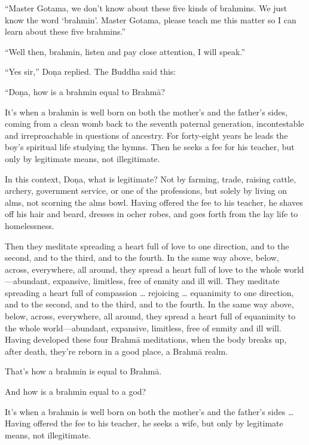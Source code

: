 \documentclass[12pt,openany]{book}%
\begin{document}
“Master Gotama, we don’t know about these five kinds of brahmins. We just know the word ‘brahmin’. Master Gotama, please teach me this matter so I can learn about these five brahmins.” 

“Well then, brahmin, listen and pay close attention, I will speak.” 

“Yes sir,” \textsanskrit{Doṇa} replied. The Buddha said this: 

“\textsanskrit{Doṇa}, how is a brahmin equal to \textsanskrit{Brahmā}? 

It’s when a brahmin is well born on both the mother’s and the father’s sides, coming from a clean womb back to the seventh paternal generation, incontestable and irreproachable in questions of ancestry. For forty-eight years he leads the boy’s spiritual life studying the hymns. Then he seeks a fee for his teacher, but only by legitimate means, not illegitimate. 

In this context, \textsanskrit{Doṇa}, what is legitimate? Not by farming, trade, raising cattle, archery, government service, or one of the professions, but solely by living on alms, not scorning the alms bowl. Having offered the fee to his teacher, he shaves off his hair and beard, dresses in ocher robes, and goes forth from the lay life to homelessness. 

Then they meditate spreading a heart full of love to one direction, and to the second, and to the third, and to the fourth. In the same way above, below, across, everywhere, all around, they spread a heart full of love to the whole world—abundant, expansive, limitless, free of enmity and ill will. They meditate spreading a heart full of compassion … rejoicing … equanimity to one direction, and to the second, and to the third, and to the fourth. In the same way above, below, across, everywhere, all around, they spread a heart full of equanimity to the whole world—abundant, expansive, limitless, free of enmity and ill will. Having developed these four \textsanskrit{Brahmā} meditations, when the body breaks up, after death, they’re reborn in a good place, a \textsanskrit{Brahmā} realm. 

That’s how a brahmin is equal to \textsanskrit{Brahmā}. 

And how is a brahmin equal to a god? 

It’s when a brahmin is well born on both the mother’s and the father’s sides … Having offered the fee to his teacher, he seeks a wife, but only by legitimate means, not illegitimate. 
\end{document}
